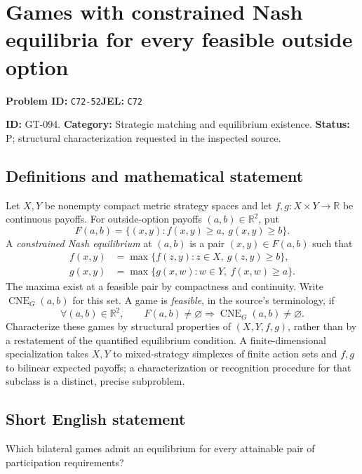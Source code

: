 \documentclass[11pt,a4paper]{article}
\begin{document}
\section*{Games with constrained Nash equilibria for every feasible outside option}
\textbf{Problem ID:} \texttt{C72-52}\quad \textbf{JEL:} \texttt{C72}\par
\label{problem:OP-0224}
\label{game:GT-094}
{\sffamily\small\color{muted}
\noindent\textbf{ID:} GT-094. \textbf{Category:} Strategic matching and equilibrium existence.
\textbf{Status:} P; structural characterization requested in the inspected source.
\par}
\subsection*{Definitions and mathematical statement}
Let $X,Y$ be nonempty compact metric strategy spaces and let
$f,g:X\times Y\to\mathbb R$ be continuous payoffs. For outside-option payoffs $(a,b)\in\mathbb R^2$, put
\[
 F(a,b)=\{(x,y):f(x,y)\geq a,\ g(x,y)\geq b\}.
\]
A \emph{constrained Nash equilibrium} at $(a,b)$ is a pair $(x,y)\in F(a,b)$ such that
\begin{align*}
 f(x,y)&=\max\{f(z,y):z\in X,\ g(z,y)\geq b\},\\
 g(x,y)&=\max\{g(x,w):w\in Y,\ f(x,w)\geq a\}.
\end{align*}
The maxima exist at a feasible pair by compactness and continuity. Write $\operatorname{CNE}_G(a,b)$ for this set. A game is \emph{feasible}, in the source's terminology, if
\[
 \forall(a,b)\in\mathbb R^2,
 \qquad F(a,b)\neq\varnothing\Longrightarrow
                 \operatorname{CNE}_G(a,b)\neq\varnothing.
\]
Characterize these games by structural properties of $(X,Y,f,g)$, rather than by a restatement of the quantified equilibrium condition. A finite-dimensional specialization takes $X,Y$ to mixed-strategy simplexes of finite action sets and $f,g$ to bilinear expected payoffs; a characterization or recognition procedure for that subclass is a distinct, precise subproblem.

\subsection*{Short English statement}
Which bilateral games admit an equilibrium for every attainable pair of participation requirements?
\end{document}
